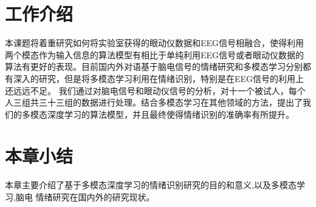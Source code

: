 	 
\section{工作介绍}
	本课题将着重研究如何将实验室获得的眼动仪数据和EEG信号相融合，使得利用两个模态作为输入信息的算法模型有相比于单纯利用EEG信号或者眼动仪数据的算法有更好的表现。目前国内外对语基于脑电信号的情绪研究和多模态学习分别都有深入的研究，但是将多模态学习利用在情绪识别，特别是在EEG信号的利用上还远远不足。
	我们通过对脑电信号和眼动仪信号的分析，对十一个被试人，每个人三组共三十三组的数据进行处理。结合多模态学习在其他领域的方法，提出了我们的多模态深度学习的算法模型，并且最终使得情绪识别的准确率有所提升。
\section{本章小结}
	本章主要介绍了基于多模态深度学习的情绪识别研究的目的和意义,以及多模态学习,脑电 情绪研究在国内外的研究现状。